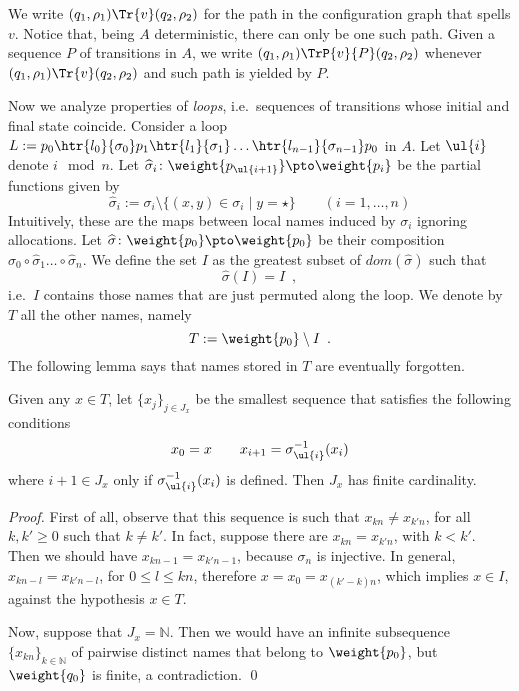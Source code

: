 
We write $(q_1,\rho_1) \Tr{v} (q_2,\rho_2)$ for the path in the configuration graph that spells $v$. Notice that, being $A$ deterministic, there can only be one such path. Given a sequence $P$ of transitions in $A$, we write $(q_1,\rho_1) \TrP{v}{P} (q_2,\rho_2)$ whenever $(q_1,\rho_1) \Tr{v} (q_2,\rho_2)$ and such path is yielded by $P$.

Now we analyze properties of \emph{loops}, i.e.\ sequences of transitions whose initial and final state coincide. Consider a loop $L := p_0 \htr{l_0}{\sigma_0} p_1 \htr{l_1}{\sigma_1} \dots \htr{l_{n-1}}{\sigma_{n-1}} p_0$ in $A$. Let $\ul{i}$ denote $i \mod n$. Let $\widehat{\sigma}_i \colon \weight{p_\ul{i+1}} \pto \weight{p_i}$ be the partial functions given by
\[
	\widehat{\sigma}_i := \sigma_i \setminus \{ (x,y) \in \sigma_i \mid y = \star \} 
	\qquad (i=1,\dots,n)
\]
Intuitively, these are the maps between local names induced by $\sigma_i$ ignoring allocations. Let $\widehat{\sigma} \colon \weight{p_0} \pto \weight{p_0}$ be their composition $\widehat{\sigma}_0 \circ \widehat{\sigma}_1 \dots \circ \widehat{\sigma}_{n}$. We define the set $I$ as the greatest subset of $dom(\widehat{\sigma})$ such that
\[
	\widehat{\sigma}(I) = I \enspace ,
\]
i.e.\ $I$ contains those names that are just permuted along the loop. We denote by $T$ all the other names, namely 
\[
	T := \weight{p_0} \setminus I \enspace .
\]
%
The following lemma says that names stored in $T$ are eventually forgotten.


\begin{lemma}
\label{lem:rho-forget}
Given any $x \in T$, let $\{x_j\}_{j \in J_x}$ be the smallest sequence that satisfies the following conditions
\[
	x_0 = x \qquad
	x_{i+1} = \sigma_{\ul{i}}^{-1}(x_i)
\]
where $i+1 \in J_x$ only if $\sigma_{\ul{i}}^{-1}(x_i)$ is defined. Then $J_x$ has finite cardinality.

\end{lemma}
\begin{proof}
First of all, observe that this sequence is such that $x_{kn} \neq x_{k'n}$, for all $k,k' \geq 0$ such that $k \neq k'$. In fact, suppose there are $x_{kn} = x_{k'n}$, with $k < k'$. Then we should have $x_{kn-1} = x_{k'n-1}$, because $\sigma_{n}$ is injective. In general, $x_{kn-l} = x_{k'n-l}$, for $0 \leq l \leq kn$, therefore $x = x_0 = x_{(k'-k)n}$, which implies $x \in I$, against the hypothesis $x \in T$.

Now, suppose that $J_x = \mathbb{N}$. Then we would have an infinite subsequence $\{x_{kn}\}_{k \in \mathbb{N}}$ of pairwise distinct names that belong to $\weight{p_0}$, but $\weight{q_0}$ is finite, a contradiction.
\qed
\end{proof}


